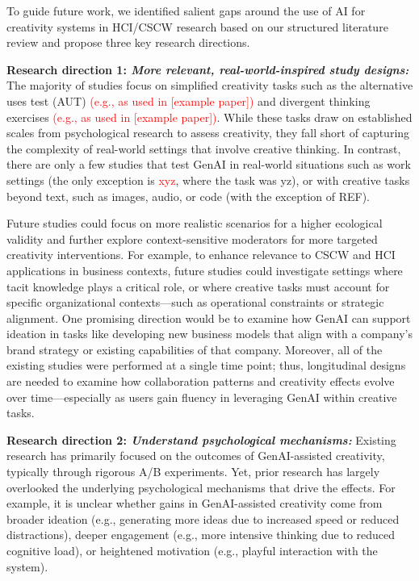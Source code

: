 \documentclass[manuscript, screen, review, acmsmall, anonymous]{acmart}
\newcommand{\TODO}[1]{\textcolor{red}{#1}}
\begin{document}
To guide future work, we identified salient gaps around the use of AI for creativity systems in HCI/CSCW research based on our structured literature review and propose three key research directions.

\textbf{Research direction 1: \textit{More relevant, real-world-inspired study designs:}} The majority of studies focus on simplified creativity tasks such as the alternative uses test (AUT) \TODO{(e.g., as used in [example paper])} and divergent thinking exercises \TODO{(e.g., as used in [example paper])}. While these tasks draw on established scales from psychological research to assess creativity, they fall short of capturing the complexity of real-world settings that involve creative thinking. In contrast, there are only a few studies that test GenAI in real-world situations such as work settings (the only exception is \TODO{xyz}, where the task was yz), or with creative tasks beyond text, such as images, audio, or code (with the exception of REF). 

Future studies could focus on more realistic scenarios for a higher ecological validity and further explore context-sensitive moderators for more targeted creativity interventions. For example, to enhance relevance to CSCW and HCI applications in business contexts, future studies could investigate settings where tacit knowledge plays a critical role, or where creative tasks must account for specific organizational contexts---such as operational constraints or strategic alignment. One promising direction would be to examine how GenAI can support ideation in tasks like developing new business models that align with a company's brand strategy or existing capabilities of that company. Moreover, all of the existing studies were performed at a single time point; thus, longitudinal designs are needed to examine how collaboration patterns and creativity effects evolve over time---especially as users gain fluency in leveraging GenAI within creative tasks.

 
    
\textbf{Research direction 2: \textit{Understand psychological mechanisms:}} Existing research has primarily focused on the outcomes of GenAI-assisted creativity, typically through rigorous A/B experiments. Yet, prior research has largely overlooked the underlying psychological mechanisms that drive the effects. For example, it is unclear whether gains in GenAI-assisted creativity come from broader ideation (e.g., generating more ideas due to increased speed or reduced distractions), deeper engagement (e.g., more intensive thinking due to reduced cognitive load), or heightened motivation (e.g., playful interaction with the system). 
\end{document}
